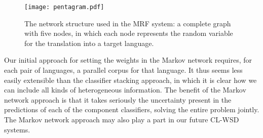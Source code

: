 \begin{figure}
  \begin{center}
  \texttt{[image: pentagram.pdf]}
  \end{center}
  \caption{The network structure used in the MRF system: a complete graph with
  five nodes, in which each node represents the random variable for the
  translation into a target language.}
  \label{fig:pentagram}
\end{figure}

Our initial approach for setting the weights in the Markov network requires,
for each pair of languages, a parallel corpus for that language. It thus seems
less easily extensible than the classifier stacking approach, in which it is
clear how we can include all kinds of heterogeneous information.
The benefit of the Markov network approach is that it takes seriously the
uncertainty present in the predictions of each of the component classifiers,
solving the entire problem jointly.
The Markov network approach may also play a part in our future CL-WSD systems.

